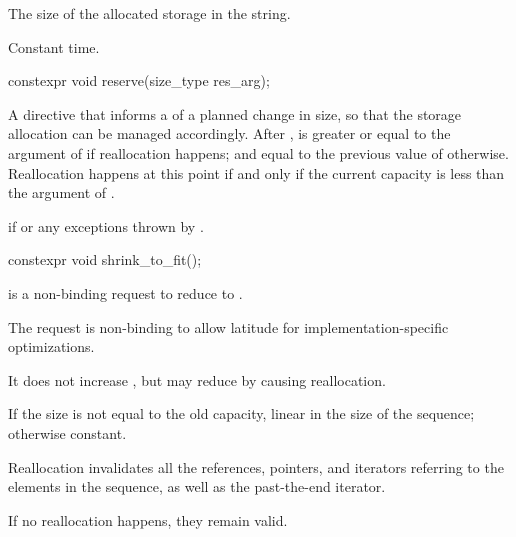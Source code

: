 \begin{itemdescr}
\pnum
\returns
The size of the allocated storage in the string.

\pnum
\complexity
Constant time.
\end{itemdescr}

%
\begin{itemdecl}
constexpr void reserve(size_type res_arg);
\end{itemdecl}

\begin{itemdescr}
\pnum
\effects
A directive that informs a  of a planned change in size,
so that the storage allocation can be managed accordingly.
After
,
is greater or equal to the argument of
if reallocation happens; and
equal to the previous value of
otherwise.
Reallocation happens at this point if and only if
the current capacity is less than the argument of .

\pnum
\throws
{}
if
 or any exceptions thrown by
 .
\end{itemdescr}

%
\begin{itemdecl}
constexpr void shrink_to_fit();
\end{itemdecl}

\begin{itemdescr}
\pnum
\effects
{} is a non-binding request to reduce
 to .
\begin{note}
The request is non-binding to
allow latitude for implementation-specific optimizations.
\end{note}
It does not increase , but may reduce 
by causing reallocation.

\pnum
\complexity
If the size is not equal to the old capacity,
linear in the size of the sequence;
otherwise constant.

\pnum
\remarks
Reallocation invalidates all the references, pointers, and iterators
referring to the elements in the sequence, as well as the past-the-end iterator.
\begin{note}
If no reallocation happens, they remain valid.
\end{note}
\end{itemdescr}

